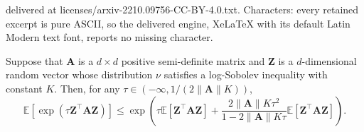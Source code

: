 \documentclass[10pt,a4paper]{amsart}
\newcommand{\E}{\mathbb{E}}
\newcommand{\bZ}{\boldsymbol{Z}}
\newcommand{\bfA}{\mathbf{A}}
\begin{document}
delivered at licenses/arxiv-2210.09756-CC-BY-4.0.txt. Characters: every retained excerpt is pure ASCII, so the delivered engine, XeLaTeX with its default Latin Modern text font, reports no missing character.
\begin{lemma}\label{lemma:expmoment}
    Suppose that $\bfA$ is a $d\times d$ positive semi-definite matrix and $\bZ$ is a $d$-dimensional random vector whose distribution $\nu$ satisfies a log-Sobolev inequality with constant $K$.
    Then, for any $\tau\in(-\infty,1/(2\|\bfA\|K))$,
    \begin{equation*}
        \E[\exp(\tau\bZ^{\top}\bfA\bZ)]\le \exp\left(\tau\E[\bZ^{\top}\bfA\bZ]+\frac{2\|\bfA\|K\tau^{2}}{1-2\|\bfA\|K\tau}\E[\bZ^{\top}\bfA\bZ]\right).
    \end{equation*}
\end{lemma}
\end{document}
